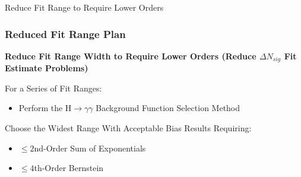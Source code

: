 \documentclass{beamer}
\newcommand{\hgamgam}{\ensuremath{\mathrm{H} \rightarrow \gamma\gamma}}
\begin{document}

\begin{frame}
  \begin{center}
    \Huge
    Reduce Fit Range to Require Lower Orders
  \end{center}
\end{frame}

\begin{frame}
\frametitle{Reduced Fit Range Plan}
  \large
  \begin{center}
    \bf  Reduce Fit Range Width to Require Lower Orders
      (Reduce $\Delta N_{sig}$ Fit Estimate Problems)
  \end{center}
  For a Series of Fit Ranges:
  \begin{itemize}
    \item Perform the \hgamgam{} Background Function Selection Method
  \end{itemize}
  Choose the Widest Range With Acceptable Bias Results Requiring:
  \begin{itemize}
    \item $\leq2$nd-Order Sum of Exponentials
    \item $\leq4$th-Order Bernstein
  \end{itemize}
\end{frame}
\end{document}
